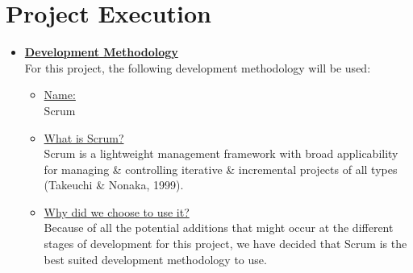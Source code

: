 \documentclass[a4paper,12pt]{article}
\begin{document}
\newpage

\section{Project Execution}

\begin{itemize}
\item {\Large \underline{\textbf{Development Methodology}}}\\[0.2cm]
For this project, the following development methodology will be used:
	\begin{itemize}
 		\item \underline{Name:}
		\\[0.1cm]
		 Scrum
		\item  \underline{What is Scrum?}
		\\[0.1cm]
		Scrum is a lightweight management framework with broad applicability for managing \& controlling iterative \& 				incremental projects of all types (Takeuchi \& Nonaka, 1999).
		\item \underline{Why did we choose to use it?}
		\\[0.1cm]
		Because of all the potential additions that might occur at the different stages of development for this project, we 			have decided that Scrum is the best suited development methodology to use.
	\end{itemize}
\end{itemize}
\end{document}
